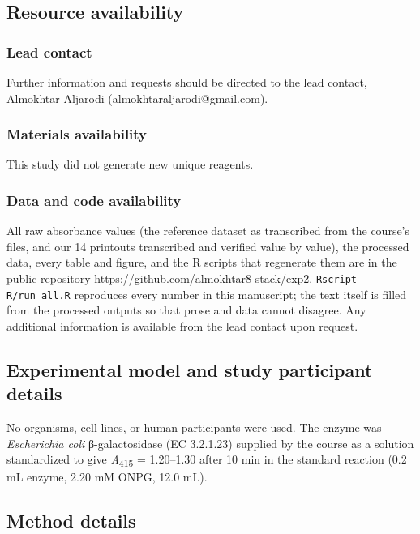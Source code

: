 \documentclass[9pt,twocolumn]{extarticle}
\newcommand{\Aa}{\textit{A}\textsubscript{415}}
\newcommand{\Ecoli}{\textit{Escherichia coli}}
\newcommand{\dash}{–}
\begin{document}
\subsection{Resource availability}
\subsubsection{Lead contact}
Further information and requests should be directed to the lead contact, Almokhtar Aljarodi (almokhtaraljarodi@gmail.com).
\subsubsection{Materials availability}
This study did not generate new unique reagents.
\subsubsection{Data and code availability}
All raw absorbance values (the reference dataset as transcribed from the course's files, and our 14 printouts transcribed and verified value by value), the processed data, every table and figure, and the R scripts that regenerate them are in the public repository \url{https://github.com/almokhtar8-stack/exp2}. \texttt{Rscript R/run\_all.R} reproduces every number in this manuscript; the text itself is filled from the processed outputs so that prose and data cannot disagree. Any additional information is available from the lead contact upon request.

\subsection{Experimental model and study participant details}
No organisms, cell lines, or human participants were used. The enzyme was \Ecoli{} β-galactosidase (EC 3.2.1.23) supplied by the course as a solution standardized to give \Aa{} = 1.20\dash 1.30 after 10 min in the standard reaction (0.2 mL enzyme, 2.20 mM ONPG, 12.0 mL).

\subsection{Method details}
\end{document}

